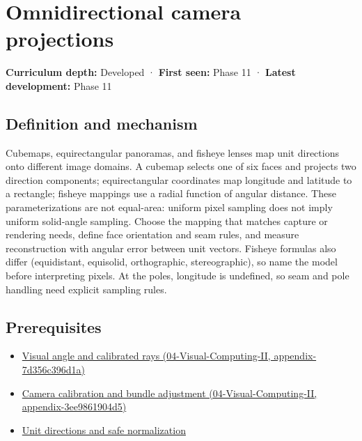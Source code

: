 \hypertarget{appendix-fc99ad39f351}{}
\section{Omnidirectional camera projections}\label{appendix-fc99ad39f351-omnidirectional-camera-projections}

\textbf{Curriculum depth:} Developed · \textbf{First seen:} Phase 11 · \textbf{Latest development:} Phase 11

\subsection{Definition and mechanism}\label{appendix-fc99ad39f351-definition-and-mechanism}

Cubemaps, equirectangular panoramas, and fisheye lenses map unit directions onto different image domains. A cubemap selects one of six faces and projects two direction components; equirectangular coordinates map longitude and latitude to a rectangle; fisheye mappings use a radial function of angular distance. These parameterizations are not equal-area: uniform pixel sampling does not imply uniform solid-angle sampling. Choose the mapping that matches capture or rendering needs, define face orientation and seam rules, and measure reconstruction with angular error between unit vectors. Fisheye formulas also differ (equidistant, equisolid, orthographic, stereographic), so name the model before interpreting pixels. At the poles, longitude is undefined, so seam and pole handling need explicit sampling rules.

\subsection{Prerequisites}\label{appendix-fc99ad39f351-prerequisites}

\begin{itemize}
\tightlist
\item
  \href{../04-Visual-Computing-II/main.pdf\#nameddest=appendix-7d356c396d1a}{Visual angle and calibrated rays (04-Visual-Computing-II, appendix-7d356c396d1a)}
\item
  \href{../04-Visual-Computing-II/main.pdf\#nameddest=appendix-3ee9861904d5}{Camera calibration and bundle adjustment (04-Visual-Computing-II, appendix-3ee9861904d5)}
\item
  \hyperref[appendix-f744e41b95b4]{Unit directions and safe normalization}
\end{itemize}


